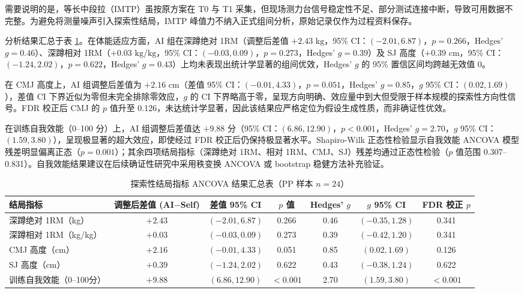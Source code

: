 \documentclass[UTF8,zihao=-4,twoside,openany]{ctexbook}
\begin{document}
需要说明的是，等长中段拉（IMTP）虽按原方案在 T0 与 T1 采集，但现场测力台信号稳定性不足、部分测试连接中断，导致可用数据不完整。为避免将测量噪声引入探索性结局，IMTP 峰值力不纳入正式组间分析，原始记录仅作为过程资料保存。

分析结果汇总于表 \ref{tab:ch4-ancova}。在体能适应方面，AI 组在深蹲绝对 1RM（调整后差值 $+2.43\text{ kg}$，95\% CI：$(-2.01, 6.87)$，$p = 0.266$，Hedges' $g = 0.46$）、深蹲相对 1RM（$+0.03\text{ kg/kg}$，95\% CI：$(-0.03, 0.09)$，$p = 0.273$，Hedges' $g = 0.39$）及 SJ 高度（$+0.39\text{ cm}$，95\% CI：$(-1.24, 2.02)$，$p = 0.622$，Hedges' $g = 0.43$）上均未表现出统计学显著的组间优效，Hedges' $g$ 的 95\% 置信区间均跨越无效值 0。

在 CMJ 高度上，AI 组调整后差值为 $+2.16\text{ cm}$（差值 95\% CI：$(-0.01, 4.33)$，$p = 0.051$，Hedges' $g = 0.85$，$g$ 95\% CI：$(0.02, 1.69)$），差值 CI 下界近似为零但未完全排除零效应，$g$ 的 CI 下界略高于零，呈现方向明确、效应量中到大但受限于样本规模的探索性方向性信号。FDR 校正后 CMJ 的 $p$ 值升至 0.126，未达统计学显著，因此该结果应严格定位为假设生成性质，而非确证性优效。

在训练自我效能（0--100 分）上，AI 组调整后差值达 $+9.88$ 分（95\% CI：$(6.86, 12.90)$，$p < 0.001$，Hedges' $g = 2.70$，$g$ 95\% CI：$(1.59, 3.80)$），呈现极显著的超大效应，即使经过 FDR 校正后仍保持极显著水平。Shapiro-Wilk 正态性检验显示自我效能 ANCOVA 模型残差明显偏离正态（$p = 0.001$）；其余四项结局指标（深蹲绝对 1RM、相对 1RM、CMJ、SJ）残差均通过正态性检验（$p$ 值范围 0.307--0.831）。自我效能结果建议在后续确证性研究中采用秩变换 ANCOVA 或 bootstrap 稳健方法补充验证。

\begin{table}[htbp]
  \centering
  \caption{探索性结局指标 ANCOVA 结果汇总表（PP 样本 $n=24$）}
  \label{tab:ch4-ancova}
  \vspace{6pt}
  \fontsize{9pt}{12pt}\selectfont
  \begin{tabularx}{\textwidth}{lcccccc}
    \toprule
    \textbf{结局指标} & \textbf{调整后差值 (AI$-$Self)} & \textbf{差值 95\% CI} & \textbf{$p$ 值} & \textbf{Hedges' $g$} & \textbf{$g$ 95\% CI} & \textbf{FDR 校正 $p$} \\
    \midrule
    深蹲绝对 1RM（kg） & $+2.43$ & $(-2.01, 6.87)$ & 0.266 & 0.46 & $(-0.35, 1.28)$ & 0.341 \\
    深蹲相对 1RM（kg/kg） & $+0.03$ & $(-0.03, 0.09)$ & 0.273 & 0.39 & $(-0.42, 1.20)$ & 0.341 \\
    CMJ 高度（cm） & $+2.16$ & $(-0.01, 4.33)$ & 0.051 & 0.85 & $(0.02, 1.69)$ & 0.126 \\
    SJ 高度（cm） & $+0.39$ & $(-1.24, 2.02)$ & 0.622 & 0.43 & $(-0.38, 1.24)$ & 0.622 \\
    训练自我效能（0--100分） & $+9.88$ & $(6.86, 12.90)$ & $<0.001$ & 2.70 & $(1.59, 3.80)$ & $<0.001$ \\
    \bottomrule
  \end{tabularx}
\end{table}
\end{document}
